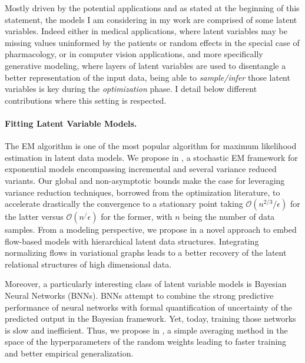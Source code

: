 \documentclass[twoside,11pt]{article}
\begin{document}
\clearpage
\vspace{0.2in}
\textbf{}
\vspace{0.2in}

Mostly driven by the potential applications and as stated at the beginning of this statement, the models I am considering in my work are comprised of some latent variables.
Indeed either in medical applications, where latent variables may be missing values uninformed by the patients or random effects in the special case of pharmacology, or in computer vision applications, and more specifically generative modeling, where layers of latent variables are used to disentangle a better representation of the input data, being able to \emph{sample/infer} those latent variables is key during the \emph{optimization} phase.
I detail below different contributions where this setting is respected.

\vspace{0.08in}
\paragraph{Fitting Latent Variable Models.} 
The EM algorithm is one of the most popular algorithm for maximum likelihood estimation in latent data models.
We propose in \citep{karimi2019global}, a stochastic EM framework for exponential models encompassing incremental and several variance reduced variants.
Our global and non-asymptotic bounds make the case for leveraging variance reduction techniques, borrowed from the optimization literature, to accelerate drastically the convergence to a stationary point taking $\mathcal{O}(n^{2/3}/\epsilon)$ for the latter versus $\mathcal{O}(n^/\epsilon)$ for the former, with $n$ being the number of data samples.
From a modeling perspective, we propose in \citep{ren2020vfg} a novel approach to embed flow-based models with hierarchical latent data structures. 
Integrating normalizing flows in variational graphs leads to a better recovery of the latent relational structures of high dimensional data.

Moreover, a particularly interesting class of latent variable models is Bayesian Neural Networks (BNNs).
BNNs attempt to combine the strong predictive performance of neural networks with formal quantification of uncertainty of the predicted output in the Bayesian framework.
Yet, today, training those networks is slow and inefficient. 
Thus, we propose in \citep{karimi2020hwa}, a simple averaging method in the space of the hyperparameters of the random weights leading to faster training and better empirical generalization.
\end{document}
